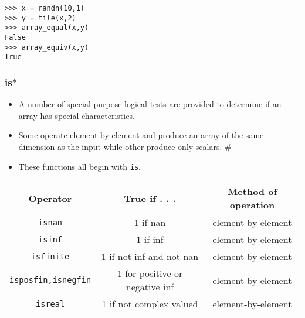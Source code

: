 \documentclass[KSmainSlides.tex]{subfiles}
\begin{document}
\begin{frame}[fragile]
\begin{framed}
\begin{verbatim}>>> x = randn(10,1)
>>> y = tile(x,2)
>>> array_equal(x,y)
False
>>> array_equiv(x,y)
True
\end{verbatim}
\end{framed}
\end{frame}
\begin{frame}[fragile]
\frametitle{ is$\ast$}
\begin{itemize}
\item A number of special purpose logical tests are provided to determine if an array has special characteristics.
\item Some operate element-by-element and produce an array of the same dimension as the input while other
produce only scalars. #\item These functions all begin with \texttt{is}.
\end{itemize}

\end{frame}
\begin{frame}[fragile]
\begin{center}
\begin{tabular}{|c|c|c|} \hline
Operator & True if . . . & Method of operation \\ \hline \hline
\texttt{isnan} & 1 if nan & element-by-element \\ \hline
\texttt{isinf} & 1 if inf & element-by-element \\ \hline
\texttt{isfinite} & 1 if not inf and not nan & element-by-element \\ \hline
\texttt{isposfin,isnegfin} & 1 for positive or negative inf & element-by-element \\ \hline
\texttt{isreal} & 1 if not complex valued & element-by-element \\ \hline
\end{tabular}
\end{center}

\end{frame}
\end{document}
